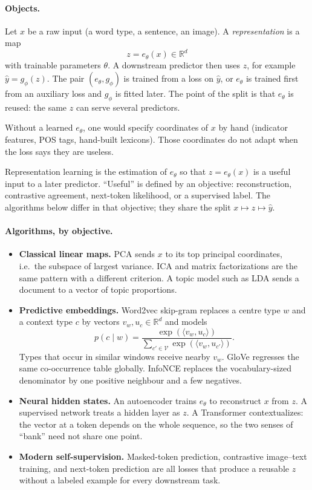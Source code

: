 \documentclass[11pt,a4paper]{article}
\theoremstyle{definition}
\begin{document}
\paragraph{Objects.}
Let \(x\) be a raw input (a word type, a sentence, an image). A \emph{representation} is a map
\[
z=e_\theta(x)\in\mathbb{R}^d
\]
with trainable parameters \(\theta\). A downstream predictor then uses \(z\), for example \(\widehat y=g_\phi(z)\). The pair \((e_\theta,g_\phi)\) is trained from a loss on \(\widehat y\), or \(e_\theta\) is trained first from an auxiliary loss and \(g_\phi\) is fitted later. The point of the split is that \(e_\theta\) is reused: the same \(z\) can serve several predictors.

Without a learned \(e_\theta\), one would specify coordinates of \(x\) by hand (indicator features, POS tags, hand-built lexicons). Those coordinates do not adapt when the loss says they are useless.

\begin{definition}\label{def:spr2025-nlp-repr}
Representation learning is the estimation of \(e_\theta\) so that \(z=e_\theta(x)\) is a useful input to a later predictor. ``Useful'' is defined by an objective: reconstruction, contrastive agreement, next-token likelihood, or a supervised label. The algorithms below differ in that objective; they share the split \(x\mapsto z\mapsto\widehat y\).
\end{definition}

\paragraph{Algorithms, by objective.}
\begin{itemize}
    \item \textbf{Classical linear maps.} PCA sends \(x\) to its top principal coordinates, i.e.\ the subspace of largest variance. ICA and matrix factorizations are the same pattern with a different criterion. A topic model such as LDA sends a document to a vector of topic proportions.
    \item \textbf{Predictive embeddings.} Word2vec skip-gram replaces a centre type \(w\) and a context type \(c\) by vectors \(v_w,u_c\in\mathbb{R}^d\) and models
    \[
    p(c\mid w)
    =\frac{\exp(\langle v_w,u_c\rangle)}{\sum_{c'\in\mathcal{V}}\exp(\langle v_w,u_{c'}\rangle)}.
    \]
    Types that occur in similar windows receive nearby \(v_w\). GloVe regresses the same co-occurrence table globally. InfoNCE replaces the vocabulary-sized denominator by one positive neighbour and a few negatives.
    \item \textbf{Neural hidden states.} An autoencoder trains \(e_\theta\) to reconstruct \(x\) from \(z\). A supervised network treats a hidden layer as \(z\). A Transformer contextualizes: the vector at a token depends on the whole sequence, so the two senses of ``bank'' need not share one point.
    \item \textbf{Modern self-supervision.} Masked-token prediction, contrastive image--text training, and next-token prediction are all losses that produce a reusable \(z\) without a labeled example for every downstream task.
\end{itemize}
\end{document}

